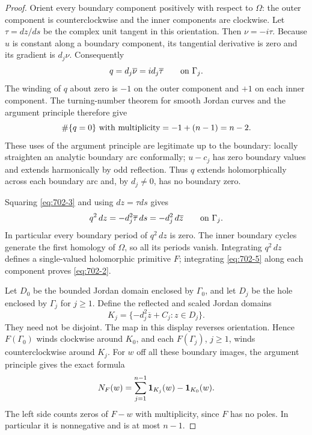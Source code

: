 \documentclass[11pt,a4paper]{article}
\theoremstyle{remark}
\begin{document}
\begin{proof}
Orient every boundary component positively with respect to $\Omega$:
the outer component is counterclockwise and the inner components are
clockwise.  Let $\tau=dz/ds$ be the complex unit tangent in this
orientation.  Then $\nu=-i\tau$.
Because $u$ is constant along a boundary component, its tangential
derivative is zero and its gradient is $d_j\nu$.  Consequently
\begin{equation}
 q=d_j\overline\nu=i d_j\overline\tau
 \qquad\hbox{on }\Gamma_j.
 \label{eq:702-3}
\end{equation}
The winding of $q$ about zero is $-1$ on the outer component and $+1$
on each inner component.  The turning-number theorem for smooth
Jordan curves and the argument principle therefore give
\begin{equation}
 \#\{q=0\}\ \hbox{with multiplicity}
 =-1+(n-1)=n-2.
 \label{eq:702-4}
\end{equation}
These uses of the argument principle are legitimate up to the
boundary: locally straighten an analytic boundary arc conformally;
$u-c_j$ has zero boundary values and extends harmonically by odd
reflection.  Thus $q$ extends holomorphically across each boundary
arc and, by $d_j\ne0$, has no boundary zero.

Squaring \eqref{eq:702-3} and using $dz=\tau ds$ gives
\begin{equation}
 q^2\,dz=-d_j^2\overline\tau\,ds
         =-d_j^2\,d\overline z
 \qquad\hbox{on }\Gamma_j.
 \label{eq:702-5}
\end{equation}
In particular every boundary period of $q^2\,dz$ is zero.
The inner boundary cycles generate the first homology of $\Omega$,
so all its periods vanish.  Integrating $q^2\,dz$ defines a
single-valued holomorphic primitive $F$; integrating \eqref{eq:702-5} along
each component proves \eqref{eq:702-2}.

Let $D_0$ be the bounded Jordan domain enclosed by $\Gamma_0$, and
let $D_j$ be the hole enclosed by $\Gamma_j$ for $j\ge1$.
Define the reflected and scaled Jordan domains
\[
 K_j=\{-d_j^2\overline z+C_j:z\in D_j\}.
\]
They need not be disjoint.  The map in this display reverses
orientation.  Hence $F(\Gamma_0)$ winds clockwise around $K_0$, and
each $F(\Gamma_j)$, $j\ge1$, winds counterclockwise around $K_j$.
For $w$ off all these boundary images, the argument principle gives
the exact formula
\begin{equation}
 N_F(w)=\sum_{j=1}^{n-1}{\bf1}_{K_j}(w)-{\bf1}_{K_0}(w).
 \label{eq:702-6}
\end{equation}
The left side counts zeros of $F-w$ with multiplicity, since $F$ has
no poles.  In particular it is nonnegative and is at most $n-1$.
\end{proof}
\end{document}

